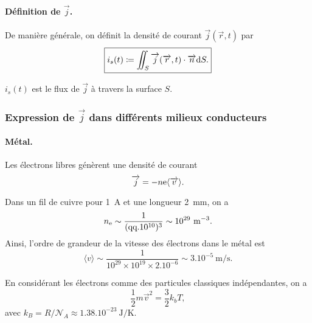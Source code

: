             \paragraph{Définition de $\vec{j}$.}

                De manière générale, on définit la densité de courant $\vec{j}(\vec{r},t)$ par 
                \begin{equation*}
                    \boxed{
                        i_s(t)\coloneqq\iint_{S}\protect\overrightarrow{{j}}(\protect\overrightarrow{{r}},t)\cdot\protect\overrightarrow{{n}}\mathrm{d} S.
                    }
                \end{equation*}

                $i_s(t)$ est le flux de $\vec{j}$ à travers la surface $S$.

        \subsubsection{Expression de $\vec{j}$ dans différents milieux conducteurs}

            \paragraph{Métal.} 
            
                Les électrons libres génèrent une densité de courant 
                \begin{equation*}
                    \protect\overrightarrow{{j}}=-n\mathrm{e} \langle \protect\overrightarrow{{v}}\rangle.
                \end{equation*}

                Dans un fil de cuivre pour 1~\si{\ampere} et une longueur 2~\si{\milli\metre}, on a 
                \begin{equation*}
                    n_{\mathrm{e}}\sim\frac{1}{(\text{qq}.10^{10})^{3}}\sim 10^{29}~\si{\per\metre\cubed}.
                \end{equation*}
                Ainsi, l'ordre de grandeur de la vitesse des électrons dans le métal est 
                \begin{equation*}
                    \langle v\rangle \sim \frac{1}{10^{29}\times10^{19}\times 2.10^{-6}}\sim3.10^{-5}~\si{\metre\per\second}.
                \end{equation*}

                En considérant les électrons comme des particules classiques indépendantes, on a 
                \begin{equation*}
                    \frac{1}{2}m\vec{v}^{2}=\frac{3}{2}k_b T,
                \end{equation*}
                avec $k_B=R/\mathcal{N}_A\approx 1.38.10^{-23}~\si{\joule\per\kelvin}$.


